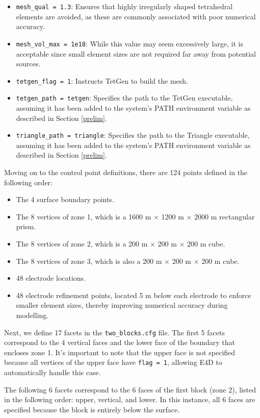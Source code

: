 \documentclass[a4paper,12pt]{article}
\begin{document}
\begin{itemize}
    \item \texttt{mesh\_qual = 1.3}: Ensures that highly irregularly shaped tetrahedral elements are avoided, as these are commonly associated with poor numerical accuracy.
    \item \texttt{mesh\_vol\_max = 1e18}: While this value may seem excessively large, it is acceptable since small element sizes are not required far away from potential sources.
    \item \texttt{tetgen\_flag = 1}: Instructs TetGen to build the mesh.
    \item \texttt{tetgen\_path = tetgen}: Specifies the path to the TetGen executable, assuming it has been added to the system's PATH environment variable as described in Section \ref{prelim}.
    \item \texttt{triangle\_path = triangle}: Specifies the path to the Triangle executable, assuming it has been added to the system's PATH environment variable as described in Section \ref{prelim}.
\end{itemize}

Moving on to the control point definitions, there are 124 points defined in the
following order:

\begin{itemize}
    \item The 4 surface boundary points.
    \item The 8 vertices of zone 1, which is a 1600 m × 1200 m × 2000 m rectangular
          prism.
    \item The 8 vertices of zone 2, which is a 200 m × 200 m × 200 m cube.
    \item The 8 vertices of zone 3, which is also a 200 m × 200 m × 200 m cube.
    \item 48 electrode locations.
    \item 48 electrode refinement points, located 5 m below each electrode to enforce smaller element sizes, thereby improving numerical accuracy during modelling.
\end{itemize}

Next, we define 17 facets in the \texttt{two\_blocks.cfg} file. The first 5
facets correspond to the 4 vertical faces and the lower face of the boundary
that encloses zone 1. It’s important to note that the upper face is not
specified because all vertices of the upper face have \texttt{flag = 1},
allowing E4D to automatically handle this case.

The following 6 facets correspond to the 6 faces of the first block (zone 2),
listed in the following order: upper, vertical, and lower. In this instance,
all 6 faces are specified because the block is entirely below the surface.
\end{document}
